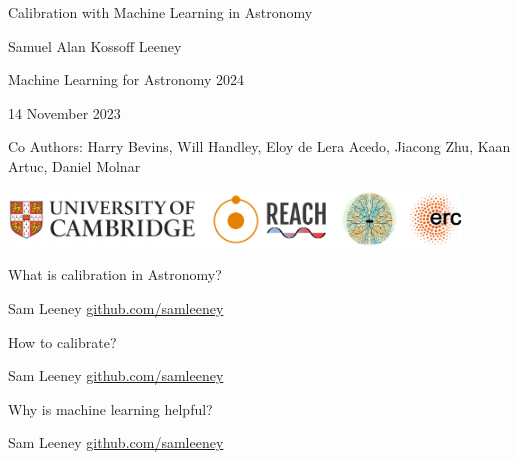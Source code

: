 \documentclass{beamer}
\begin{document}
\begin{frame}
  \begin{center}
    {\LARGE Calibration with Machine Learning in Astronomy\par}
    \vspace{0.5cm}

    {\large Samuel Alan Kossoff Leeney\par}
    \vspace{0.5cm}

    {\normalsize Machine Learning for Astronomy 2024\par}

    {\normalsize 14 November 2023\par}
    \vspace{1cm}

    {\footnotesize Co Authors: Harry Bevins, Will Handley, Eloy de Lera Acedo, Jiacong Zhu, Kaan Artuc, Daniel Molnar\par}
    \vfill

    \includegraphics[width=0.9\textwidth]{affiliations.png}
  \end{center}
\end{frame}

\begin{frame}{\small{What is calibration in Astronomy?}}
\begin{figure}[h]
  \centering
  
\end{figure}
\vfill
\tiny{Sam Leeney \hfill \href{https://github.com/samleeney}{github.com/samleeney}}
\end{frame}


\begin{frame}{\small{How to calibrate?}}
\begin{figure}[h]
  \centering
  
\end{figure}
\vspace{0.7cm}
\tiny{Sam Leeney \hfill \href{https://github.com/samleeney}{github.com/samleeney}}

\end{frame}


\begin{frame}{\small{Why is machine learning helpful?}}
\begin{figure}[h]
  \centering
  
\end{figure}
\vfill
\tiny{Sam Leeney \hfill \href{https://github.com/samleeney}{github.com/samleeney}}
\end{frame}
\end{document}
